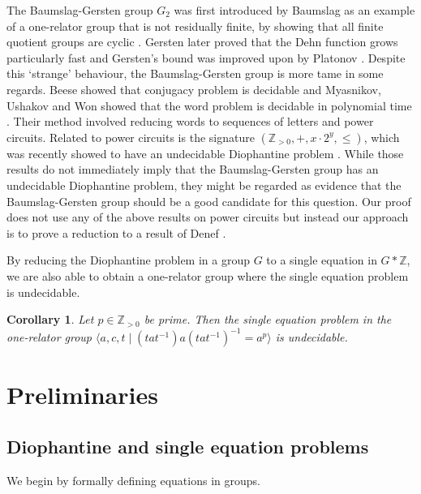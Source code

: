\documentclass[11pt]{amsart}
\newtheorem{cor}[theorem]{Corollary}
\theoremstyle{definition}
\numberwithin{theorem}{section}
\newcommand{\Z}{\mathbb{Z}}
\begin{document}
	The Baumslag-Gersten group \(G_2\) was first introduced by Baumslag as an example
	of a one-relator group that is not residually finite, by showing that all
	finite quotient groups are cyclic \cite{Baumslag69}. Gersten later proved
	that the Dehn function grows particularly fast \cite{Gersten92} and
	Gersten's bound was improved upon by Platonov \cite{Platonov04}.
	Despite this `strange' behaviour, the Baumslag-Gersten group is more
	tame in some regards. Beese
	showed that conjugacy problem is decidable \cite{BeeseThesis} and
	Myasnikov, Ushakov and Won showed that the word problem is decidable
	in polynomial time \cite{MyasnikovUshakovWon}. Their method involved
	reducing words to sequences of letters and power circuits. Related
	to power circuits is the signature \((\Z_{> 0}, +, x \cdot 2^y, \leq)\),
	which was recently showed to have an undecidable Diophantine problem
	\cite{Rybalov}. 
While those results do not immediately imply that the Baumslag-Gersten group has an undecidable Diophantine problem, they might be regarded as evidence that the Baumslag-Gersten group should be a good candidate for this question.  
Our proof does not use any of the above results on power circuits but 
instead our approach is to prove a reduction to a result of Denef
	\cite{Denef}.

	By reducing the Diophantine problem in a group \(G\) to a single equation
	in \(G \ast \Z\), we are also able to obtain a one-relator group where
	the single equation problem is undecidable.

\begin{cor}
	\label{main-cor}
	Let \(p \in \Z_{> 0}\) be prime. Then the single equation problem in the
	one-relator group
	\(\langle a, c, t  \mid
	(tat^{-1}) a(tat^{-1})^{-1} = a^p \rangle\) is undecidable.
\end{cor}

\section{Preliminaries}
\label{sec:prelim}

\subsection{Diophantine and single equation problems}
	
	We begin by formally defining equations in groups.
\end{document}
